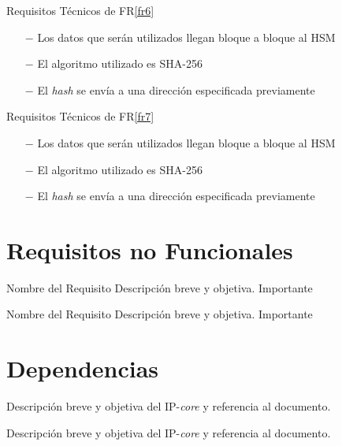 \documentclass{article}
\begin{document}
\begin{technical}
            \techrequirement
            {Requisitos Técnicos de FR\ref{fr6}}
      {
      \begin{itemize}
        \item[$-$]{Los datos que serán utilizados llegan bloque a bloque al HSM}
        \item[$-$]{El algoritmo utilizado es SHA-256}
                \item[$-$]{El \textit{hash} se envía a una dirección especificada previamente}
      \end{itemize}
      }
            
            \techrequirement
            {Requisitos Técnicos de FR\ref{fr7}}
      {
      \begin{itemize}
        \item[$-$]{Los datos que serán utilizados llegan bloque a bloque al HSM}
        \item[$-$]{El algoritmo utilizado es SHA-256}
                \item[$-$]{El \textit{hash} se envía a una dirección especificada previamente}
      \end{itemize}
      }
    \end{technical}    
 
\section{Requisitos no Funcionales}

  \begin{nonfunctional}
        {Nombre del Requisito}
    {Descripción breve y objetiva.}
    {Importante}

        {Nombre del Requisito}
    {Descripción breve y objetiva.}
    {Importante}
  \end{nonfunctional}

\section{Dependencias}

  \begin{dependencies}
        {Descripción breve y objetiva del IP-\textit{core} y referencia al documento.}

        {Descripción breve y objetiva del IP-\textit{core} y referencia al documento.}
  \end{dependencies}  
\end{document}
